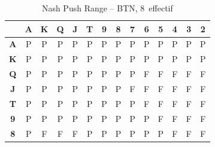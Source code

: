\documentclass[a4paper,11pt]{article}
\newcommand{\bb}{\,\mathrm{bb}}
\begin{document}
\begin{table}[H]
\centering
\caption{Nash Push Range -- BTN, 8\bb{} effectif}
\label{tab:nash_8bb}
\small
\begin{tabular}{c|*{13}{c}}
\toprule
 & \textbf{A} & \textbf{K} & \textbf{Q} & \textbf{J} & \textbf{T} & \textbf{9} & \textbf{8} & \textbf{7} & \textbf{6} & \textbf{5} & \textbf{4} & \textbf{3} & \textbf{2} \\
\midrule
\textbf{A} & \cellcolor{push!25}P & \cellcolor{push!25}P & \cellcolor{push!25}P & \cellcolor{push!25}P & \cellcolor{push!25}P & \cellcolor{push!25}P & \cellcolor{push!25}P & \cellcolor{push!25}P & \cellcolor{push!25}P & \cellcolor{push!25}P & \cellcolor{push!25}P & \cellcolor{push!25}P & \cellcolor{push!25}P \\
\textbf{K} & \cellcolor{push!25}P & \cellcolor{push!25}P & \cellcolor{push!25}P & \cellcolor{push!25}P & \cellcolor{push!25}P & \cellcolor{push!25}P & \cellcolor{push!25}P & \cellcolor{push!20}P & \cellcolor{push!15}P & \cellcolor{push!15}P & \cellcolor{push!15}P & \cellcolor{push!15}P & \cellcolor{push!15}P \\
\textbf{Q} & \cellcolor{push!25}P & \cellcolor{push!25}P & \cellcolor{push!25}P & \cellcolor{push!25}P & \cellcolor{push!25}P & \cellcolor{push!20}P & \cellcolor{push!15}P & \cellcolor{push!15}P & \cellcolor{fold!20}F & \cellcolor{fold!20}F & \cellcolor{fold!20}F & \cellcolor{fold!20}F & \cellcolor{fold!20}F \\
\textbf{J} & \cellcolor{push!25}P & \cellcolor{push!20}P & \cellcolor{push!20}P & \cellcolor{push!25}P & \cellcolor{push!25}P & \cellcolor{push!20}P & \cellcolor{push!15}P & \cellcolor{fold!20}F & \cellcolor{fold!20}F & \cellcolor{fold!20}F & \cellcolor{fold!20}F & \cellcolor{fold!20}F & \cellcolor{fold!20}F \\
\textbf{T} & \cellcolor{push!20}P & \cellcolor{push!20}P & \cellcolor{push!15}P & \cellcolor{push!20}P & \cellcolor{push!25}P & \cellcolor{push!20}P & \cellcolor{push!15}P & \cellcolor{push!10}P & \cellcolor{fold!20}F & \cellcolor{fold!20}F & \cellcolor{fold!20}F & \cellcolor{fold!20}F & \cellcolor{fold!20}F \\
\textbf{9} & \cellcolor{push!20}P & \cellcolor{push!15}P & \cellcolor{push!10}P & \cellcolor{push!10}P & \cellcolor{push!15}P & \cellcolor{push!25}P & \cellcolor{push!15}P & \cellcolor{push!10}P & \cellcolor{push!10}P & \cellcolor{fold!20}F & \cellcolor{fold!20}F & \cellcolor{fold!20}F & \cellcolor{fold!20}F \\
\textbf{8} & \cellcolor{push!15}P & \cellcolor{fold!20}F & \cellcolor{fold!20}F & \cellcolor{fold!20}F & \cellcolor{push!10}P & \cellcolor{push!10}P & \cellcolor{push!25}P & \cellcolor{push!15}P & \cellcolor{push!10}P & \cellcolor{push!10}P & \cellcolor{fold!20}F & \cellcolor{fold!20}F & \cellcolor{fold!20}F \\

\end{tabular}
\end{table}
\end{document}
